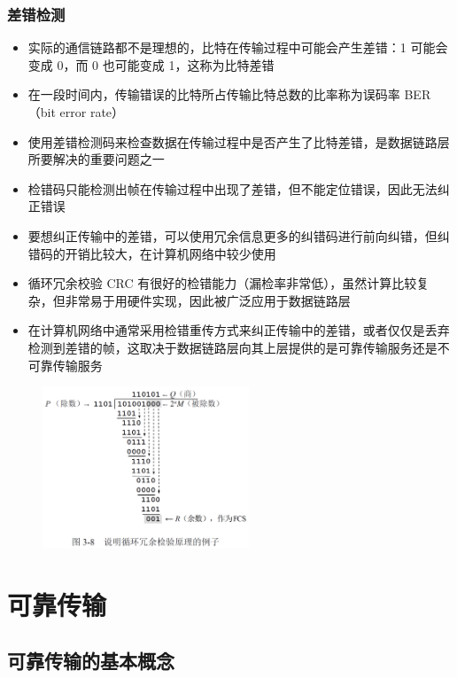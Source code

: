\documentclass[cs4size,a4paper,10pt]{ctexart}
\begin{document}
	\subsubsection{差错检测}
	\begin{itemize}
		\item 实际的通信链路都不是理想的，比特在传输过程中可能会产生差错：1 可能会变成 0，而 0 也可能变成 1，这称为比特差错
		\item 在一段时间内，传输错误的比特所占传输比特总数的比率称为误码率 BER（bit error rate）
		\item 使用差错检测码来检查数据在传输过程中是否产生了比特差错，是数据链路层所要解决的重要问题之一
		\item 检错码只能检测出帧在传输过程中出现了差错，但不能定位错误，因此无法纠正错误
		\item 要想纠正传输中的差错，可以使用冗余信息更多的纠错码进行前向纠错，但纠错码的开销比较大，在计算机网络中较少使用
		\item 循环冗余校验 CRC 有很好的检错能力（漏检率非常低），虽然计算比较复杂，但非常易于用硬件实现，因此被广泛应用于数据链路层
		\item 在计算机网络中通常采用检错重传方式来纠正传输中的差错，或者仅仅是丢弃检测到差错的帧，这取决于数据链路层向其上层提供的是可靠传输服务还是不可靠传输服务
	\end{itemize}

	\begin{figure}[H]
		\centering
		\includegraphics[width=0.55\textwidth]{img/3.8}
	\end{figure}


	\section{可靠传输}

	\subsection{可靠传输的基本概念}
\end{document}
